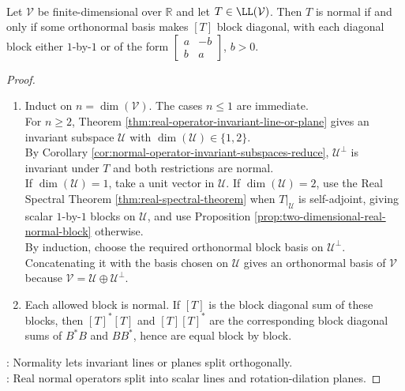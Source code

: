 \begin{theorem} \label{thm:real-normal-operator-block-diagonal-form} \\
Let $\mathcal{V}$ be finite-dimensional over $\mathbb{R}$ and let $T\in\LL(\mathcal{V})$. Then $T$ is normal if and only if some orthonormal basis makes $[T]$ block diagonal, with each diagonal block either $1$-by-$1$ or of the form $\begin{bmatrix}
a&-b\\
b&a
\end{bmatrix}$, $b > 0$.
\begin{proof}
\begin{enumerate}[label=\roman*.]
\setlength{\itemsep}{0pt}
\item[$(\Rightarrow)$] Induct on $n=\dim(\mathcal{V})$. The cases $n\leq1$ are immediate.\\
For $n\geq2$, Theorem \ref{thm:real-operator-invariant-line-or-plane} gives an invariant subspace $\mathcal{U}$ with $\dim(\mathcal{U})\in\{1,2\}$.\\
By Corollary \ref{cor:normal-operator-invariant-subspaces-reduce}, $\mathcal{U}^{\perp}$ is invariant under $T$ and both restrictions are normal.\\
If $\dim(\mathcal{U})=1$, take a unit vector in $\mathcal{U}$. If $\dim(\mathcal{U})=2$, use the Real Spectral Theorem \ref{thm:real-spectral-theorem} when $T|_{\mathcal{U}}$ is self-adjoint, giving scalar $1$-by-$1$ blocks on $\mathcal{U}$, and use Proposition \ref{prop:two-dimensional-real-normal-block} otherwise.\\
By induction, choose the required orthonormal block basis on $\mathcal{U}^{\perp}$. Concatenating it with the basis chosen on $\mathcal{U}$ gives an orthonormal basis of $\mathcal{V}$ because $\mathcal{V}=\mathcal{U}\oplus\mathcal{U}^{\perp}$.
\item[$(\Leftarrow)$] Each allowed block is normal. If $[T]$ is the block diagonal sum of these blocks, then $[T]^*[T]$ and $[T][T]^*$ are the corresponding block diagonal sums of $B^*B$ and $BB^*$, hence are equal block by block.
\end{enumerate}
: Normality lets invariant lines or planes split orthogonally.\\
: Real normal operators split into scalar lines and rotation-dilation planes.
\end{proof}
\end{theorem}

